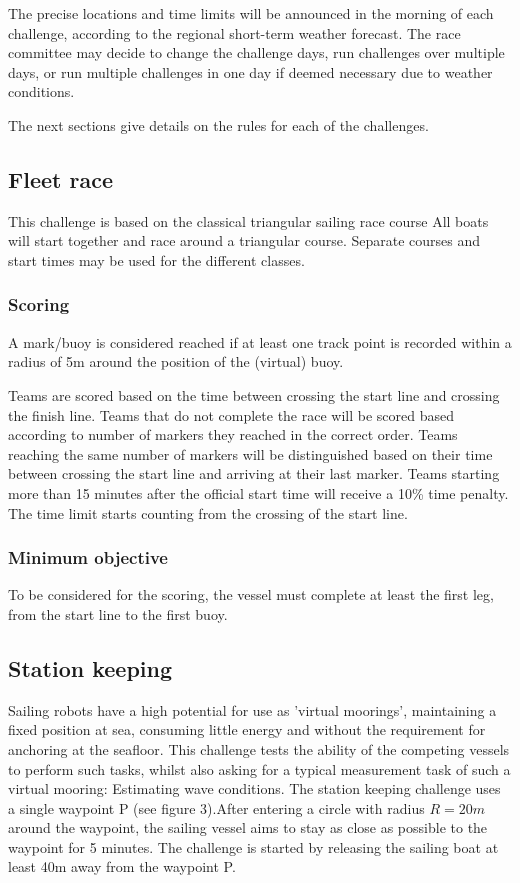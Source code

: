 \documentclass[12pt]{article}
\begin{document}
The precise locations and time limits will be announced in the morning of each challenge, 
according to the regional short-term weather forecast.
The race committee may decide to change the challenge days, run challenges over
multiple days, or run multiple challenges in one day if deemed necessary due 
to weather conditions.

The next sections give details on the rules for each of the challenges.

\subsection{Fleet race}

This challenge is based on the classical triangular sailing race course
All boats will start together and race around a triangular course. Separate
courses and start times may be used for the different classes.

\subsubsection{Scoring}
A mark/buoy is considered reached if at least one
track point is recorded within a radius of 5m around the position of the
(virtual) buoy.

Teams are scored based on the time between crossing the start line and crossing
the finish line. Teams that do not complete the race will be scored based
according to number of markers they reached in the correct order. Teams reaching
the same number of markers will be distinguished based on their time between
crossing the start line and arriving at their last marker. Teams starting more
than 15 minutes after the official start time will receive a 10\% time penalty.
The time limit starts counting from the crossing of the start line.

\subsubsection{Minimum objective}
To be considered for the scoring, the vessel must complete at least the first
leg, from the start line to the first buoy.

\subsection{Station keeping}
Sailing robots have a high potential for use as 'virtual moorings', maintaining
a fixed position at sea, consuming little energy and without the requirement for
anchoring at the seafloor. This challenge tests the ability of the competing
vessels to perform such tasks, whilst also asking for a typical measurement task
of such a virtual mooring: Estimating wave conditions.
The station keeping challenge uses a single waypoint P
(see figure 3).After entering a circle with radius $R=20m$ around the waypoint, the 
sailing vessel aims to stay as close as possible to the waypoint for 5 minutes.
The challenge is started by releasing the sailing boat at least 40m away
from the waypoint P.
\end{document}
